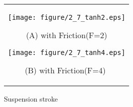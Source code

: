 \documentclass{article_vdlab_sotsuron_youshi}
\begin{document}
　
\vspace{-2mm}
\begin{figure}[h]
    \begin{tabular}{c}
      \begin{minipage}{0.5\hsize}
	\begin{center}
	  \texttt{[image: figure/2\_7\_tanh2.eps]}
	\end{center}
	\begin{center}
	  \vspace{-2mm}
	  \ (A) with Friction(F=2)\
	  \end{center}
      \end{minipage}
      \begin{minipage}{0.5\hsize}
	\begin{center}
	  \texttt{[image: figure/2\_7\_tanh4.eps]}
	  \end{center}
	  \begin{center}
	  \vspace{-2mm}
	  \ (B) with Friction(F=4) \
	  \end{center}
      \end{minipage}
    \end{tabular}
    \vspace{-1mm}
    \caption{Suspension stroke}
    \label{fig:masatsu}
\end{figure}
\end{document}
